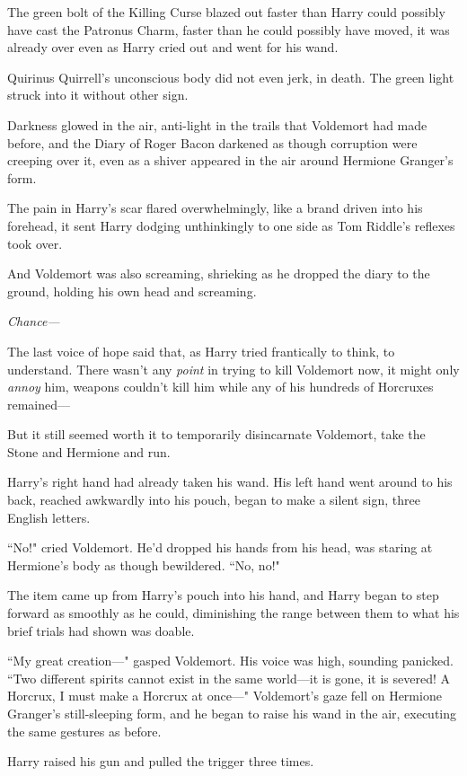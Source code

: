 The green bolt of the Killing Curse blazed out faster than Harry could possibly have cast the Patronus Charm, faster than he could possibly have moved, it was already over even as Harry cried out and went for his wand.

Quirinus Quirrell's unconscious body did not even jerk, in death. The green light struck into it without other sign.

Darkness glowed in the air, anti-light in the trails that Voldemort had made before, and the Diary of Roger Bacon darkened as though corruption were creeping over it, even as a shiver appeared in the air around Hermione Granger's form.

The pain in Harry's scar flared overwhelmingly, like a brand driven into his forehead, it sent Harry dodging unthinkingly to one side as Tom Riddle's reflexes took over.

And Voldemort was also screaming, shrieking as he dropped the diary to the ground, holding his own head and screaming.

\emph{Chance—}

The last voice of hope said that, as Harry tried frantically to think, to understand. There wasn't any \emph{point} in trying to kill Voldemort now, it might only \emph{annoy} him, weapons couldn't kill him while any of his hundreds of Horcruxes remained—

But it still seemed worth it to temporarily disincarnate Voldemort, take the Stone and Hermione and run.

Harry's right hand had already taken his wand. His left hand went around to his back, reached awkwardly into his pouch, began to make a silent sign, three English letters.

``No!" cried Voldemort. He'd dropped his hands from his head, was staring at Hermione's body as though bewildered. ``No, no!"

The item came up from Harry's pouch into his hand, and Harry began to step forward as smoothly as he could, diminishing the range between them to what his brief trials had shown was doable.

``My great creation—" gasped Voldemort. His voice was high, sounding panicked. ``Two different spirits cannot exist in the same world—it is gone, it is severed! A Horcrux, I must make a Horcrux at once—" Voldemort's gaze fell on Hermione Granger's still-sleeping form, and he began to raise his wand in the air, executing the same gestures as before.

Harry raised his gun and pulled the trigger three times.

